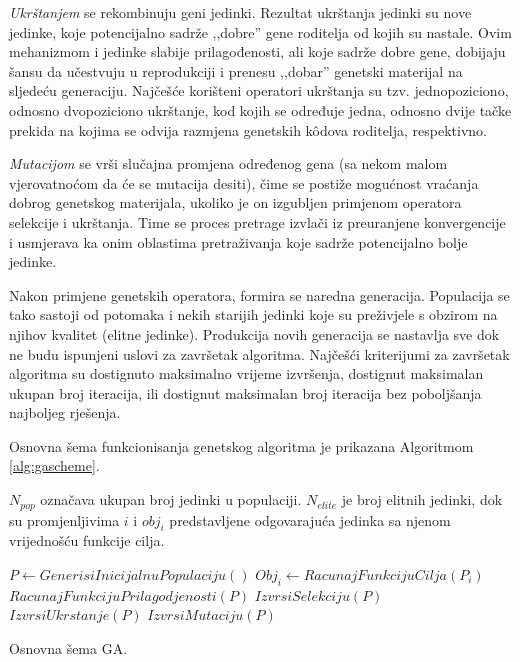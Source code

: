 \documentclass[a4paper, utf8, 11pt, colorlinks]{book}
\theoremstyle{definition}
\begin{document}
\emph{Ukrštanjem} se rekombinuju geni jedinki. Rezultat ukrštanja jedinki su nove jedinke, koje potencijalno sadrže ,,dobre'' gene  roditelja od kojih su nastale. Ovim mehanizmom  i jedinke slabije prilagođenosti, ali koje sadrže dobre gene, dobijaju šansu da učestvuju u reprodukciji i prenesu ,,dobar'' genetski materijal na sljedeću generaciju. Najčešće korišteni operatori ukrštanja su tzv. jednopoziciono, odnosno dvopoziciono ukrštanje, kod kojih se određuje jedna, odnosno dvije tačke prekida na kojima se odvija razmjena genetskih k\^odova roditelja, respektivno.

\emph{Mutacijom} se vrši slučajna promjena određenog gena (sa nekom malom vjerovatnoćom da će se mutacija desiti), čime se postiže mogućnost vraćanja dobrog genetskog materijala, ukoliko je on izgubljen primjenom operatora selekcije i ukrštanja. Time se proces pretrage izvlači iz preuranjene konvergencije i usmjerava ka onim oblastima pretraživanja koje sadrže potencijalno bolje jedinke.


Nakon primjene genetskih operatora, formira se naredna generacija. Populacija se tako sastoji od potomaka i nekih starijih jedinki koje su preživjele s obzirom na njihov kvalitet (elitne jedinke). Produkcija novih generacija se nastavlja sve dok ne budu ispunjeni uslovi za završetak algoritma. Najčešći kriterijumi za završetak algoritma su dostignuto maksimalno vrijeme izvršenja, dostignut  maksimalan ukupan broj iteracija, ili dostignut maksimalan broj iteracija bez poboljšanja najboljeg rješenja.

Osnovna šema funkcionisanja genetskog algoritma je prikazana Algoritmom \ref{alg:gascheme}.

$N_{pop}$ označava ukupan broj jedinki u populaciji.  $N_{elite}$ je broj elitnih jedinki, dok su promjenljivima  $i$ i $obj_{i}$ predstavljene odgovarajuća jedinka sa njenom vrijednošću funkcije cilja.

\begin{algorithm}
	\begin{algorithmic}[1]
		 \STATE  $ P \gets GenerisiInicijalnuPopulaciju()$
		            \STATE $Obj_i \gets RacunajFunkcijuCilja(P_i)$
		       \ENDFOR
		       \STATE $RacunajFunkcijuPrilagodjenosti(P)$
		       \STATE $IzvrsiSelekciju(P)$
		       \STATE $IzvrsiUkrstanje(P)$		  
		       \STATE $IzvrsiMutaciju(P)$
		 \ENDWHILE
	\end{algorithmic}
    \caption{Osnovna šema GA.}
    \label{alg:gascheme}
\end{algorithm}
\end{document}
